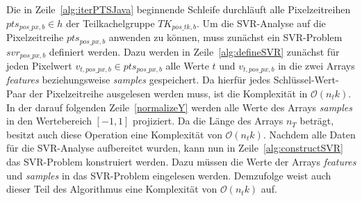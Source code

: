 Die in Zeile~\ref{alg:iterPTSJava} beginnende Schleife durchläuft alle Pixelzeitreihen $pts_{pos\_px, b} \in h$ der Teilkachelgruppe $TK_{pos\_tk, b}$. Um die SVR-Analyse auf die Pixelzeitreihe $pts_{pos\_px, b}$ anwenden zu können, muss zunächst ein SVR-Problem $svr_{pos\_{px}, b}$ definiert werden. Dazu werden in Zeile~\ref{alg:defineSVR} zunächst für jeden Pixelwert $v_{t, pos\_px, b} \in pts_{pos\_px, b}$ alle Werte $t$ und $v_{t, pos\_px, b}$ in die zwei Arrays \textit{features} beziehungsweise \textit{samples} gespeichert. Da hierfür jedes Schlüssel-Wert-Paar der Pixelzeitreihe ausgelesen werden muss, ist die Komplexität in $\mathcal{O}(n_tk)$. In der darauf folgenden Zeile~\ref{normalizeY} werden alle Werte des Arrays \textit{samples } in den Wertebereich $[-1, 1]$ projiziert. Da die Länge des Arrays $n_T$ beträgt, besitzt auch diese Operation eine Komplexität von $\mathcal{O}(n_tk)$. Nachdem alle Daten für die SVR-Analyse aufbereitet wurden, kann nun in Zeile~\ref{alg:constructSVR} das SVR-Problem konstruiert werden. Dazu müssen die Werte der Arrays \textit{features} und \textit{samples} in das SVR-Problem eingelesen werden. Demzufolge weist auch dieser Teil des Algorithmus eine Komplexität von $\mathcal{O}(n_tk)$ auf.

